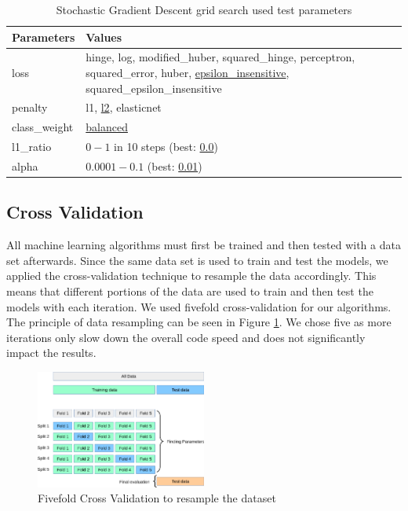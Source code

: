 \documentclass[11pt]{article}
\renewcommand{\arraystretch}{1.3}
\begin{document}
	\begin{table}[H]
		\renewcommand{\arraystretch}{1.3}
		\centering
		\begin{tabularx}{\textwidth}{lX}
			Parameters & Values \\
			\toprule
			loss &  hinge, log, modified\_huber, squared\_hinge, perceptron, squared\_error, huber, \underline{epsilon\_insensitive}, squared\_epsilon\_insensitive\\
			penalty & l1, \underline{l2}, elasticnet   \\
			class\_weight & \underline{balanced}\\
			l1\_ratio & $0-1$ in 10 steps (best: \underline{0.0})\\
			alpha & $0.0001 - 0.1$ (best: \underline{0.01})\\
		\end{tabularx}
		\caption{Stochastic Gradient Descent grid search used test parameters}
		\label{tab:SGDParameters}
	\end{table}


	
	\subsection{Cross Validation}
	All machine learning algorithms must first be trained and then tested with a data set afterwards. Since the same data set is used to train and test the models, we applied the cross-validation technique to resample the data accordingly. This means that different portions of the data are used to train and then test the models with each iteration. We used fivefold cross-validation for our algorithms. The principle of data resampling can be seen in Figure \ref{fig:crossValidation}. We chose five as more iterations only slow down the overall code speed and does not significantly impact the results.
	\begin{figure}[H]
		\centering
		\includegraphics[width=0.5\textwidth]{img/grid_search_cross_validation.png}
		\caption{Fivefold Cross Validation to resample the dataset \cite{scikit}}
		\label{fig:crossValidation}
	\end{figure}
\end{document}
